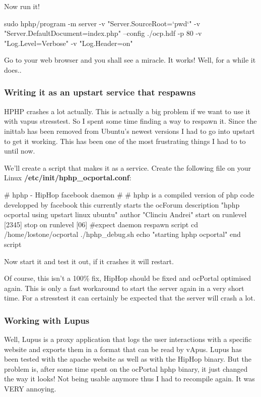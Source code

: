 Now run it!
\begin{codelisting}
sudo hphp/program -m server -v "Server.SourceRoot=`pwd`" -v
"Server.DefaultDocument=index.php" --config ./ocp.hdf -p 80 -v
"Log.Level=Verbose" -v "Log.Header=on"
\end{codelisting}

Go to your web browser and you shall see a miracle. It works!
Well, for a while it does..

\subsubsection{Writing it as an upstart service that respawns}
HPHP crashes a lot actually. This is actually a big problem if we want to use it with \gls{vapus} stresstest.  So I spent some time finding a way to respawn it. 
Since the inittab has been removed from Ubuntu's newest versions I had to go into upstart to get it working. This has been one of the most frustrating things I had to to until now. 

We'll create a script that makes it as a service.
Create the following file on your Linux \textbf{/etc/init/hphp\_ocportal.conf}:
\begin{codelisting}
# hphp - HipHop facebook daemon
#
# hphp is a compiled version of php code developped by facebook this currently starts the ocForum
description "hphp ocportal using upstart linux ubuntu"
author "Clinciu Andrei"
start on runlevel [2345]
stop on runlevel [06]
#expect daemon
respawn
script
cd /home/lostone/ocportal
./hphp_debug.sh
echo "starting hphp ocportal"
end script
\end{codelisting}

Now start it and test it out, if it crashes it will restart.
	
Of course, this isn't a 100\% fix, HipHop should be fixed and ocPortal optimised again. This is only a fast workaround to start the server again in a very short time. For a stresstest it can certainly be expected that the server will crash a lot.

\subsubsection{Working with Lupus}
Well, Lupus is a proxy application that logs the user interactions with a specific website and exports them in a format that can be read by vApus.
Lupus has been tested with the \gls{apache} website as well as with the HipHop binary.
But the problem is, after some time spent on the ocPortal \gls{hphp} binary, it just changed the way it looks! 
Not being usable anymore thus I had to recompile again. It was VERY annoying.

